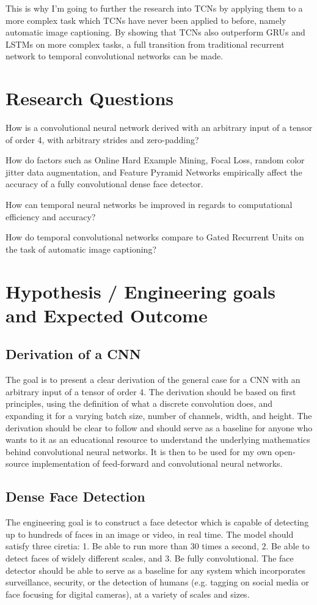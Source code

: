 \documentclass[a4paper, twoside]{article}
\begin{document}
This is why I'm going to further the research into TCNs by applying them to a more complex task which TCNs have never been applied to before, namely automatic image captioning. By showing that TCNs also outperform GRUs and LSTMs on more complex tasks, a full transition from traditional recurrent network to temporal convolutional networks can be made.

\section{Research Questions}
How is a convolutional neural network derived with an arbitrary input of a tensor of order 4, with arbitrary strides and zero-padding?

How do factors such as Online Hard Example Mining, Focal Loss, random color jitter data augmentation, and Feature Pyramid Networks empirically affect the accuracy of a fully convolutional dense face detector.

How can temporal neural networks be improved in regards to computational efficiency and accuracy?

How do temporal convolutional networks compare to Gated Recurrent Units on the task of automatic image captioning?

\section{Hypothesis / Engineering goals and Expected Outcome}
\subsection{Derivation of a CNN}
The goal is to present a clear derivation of the general case for a CNN with an arbitrary input of a tensor of order 4. The derivation should be based on first principles, using the definition of what a discrete convolution does, and expanding it for a varying batch size, number of channels, width, and height. The derivation should be clear to follow and should serve as a baseline for anyone who wants to it as an educational resource to understand the underlying mathematics behind convolutional neural networks. It is then to be used for my own open-source implementation of feed-forward and convolutional neural networks.

\subsection{Dense Face Detection}
The engineering goal is to construct a face detector which is capable of detecting up to hundreds of faces in an image or video, in real time. The model should satisfy three ciretia: 1. Be able to run more than 30 times a second, 2. Be able to detect faces of widely different scales, and 3. Be fully convolutional. The face detector should be able to serve as a baseline for any system which incorporates surveillance, security, or the detection of humans (e.g. tagging on social media or face focusing for digital cameras), at a variety of scales and sizes.
\end{document}
